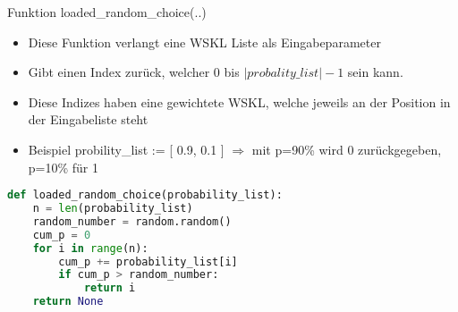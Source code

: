 \begin{frame}[fragile]{Funktion loaded\_random\_choice(..)}
  \begin{itemize}
    \item Diese Funktion verlangt eine WSKL Liste als Eingabeparameter
    \item Gibt einen Index zurück, welcher 0 bis $\left\vert{probality\_list}\right\vert-1$ sein kann.
    \item Diese Indizes haben eine gewichtete WSKL, welche jeweils an der Position in der Eingabeliste steht
    \item Beispiel probility\_list := [ 0.9, 0.1 ]  $\Rightarrow$ mit p=90\% wird 0 zurückgegeben, p=10\% für 1
  \end{itemize}
  \begin{lstlisting}[language=python]
def loaded_random_choice(probability_list):
    n = len(probability_list)
    random_number = random.random()
    cum_p = 0
    for i in range(n):
        cum_p += probability_list[i]
        if cum_p > random_number:
            return i
    return None
\end{lstlisting}
\logopythonbottom
\end{frame}	